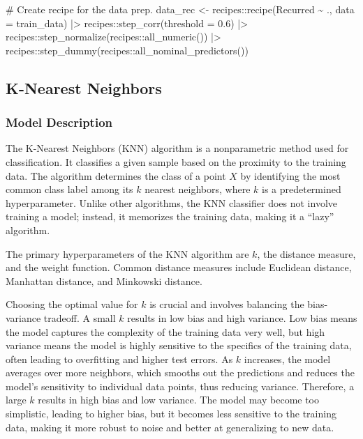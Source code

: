 \documentclass[
  letterpaper,
  DIV=11,
  numbers=noendperiod]{scrartcl}
\newenvironment{Shaded}{\begin{snugshade}}{\end{snugshade}}
\newcommand{\AttributeTok}[1]{\textcolor[rgb]{0.40,0.45,0.13}{#1}}
\newcommand{\CommentTok}[1]{\textcolor[rgb]{0.37,0.37,0.37}{#1}}
\newcommand{\FloatTok}[1]{\textcolor[rgb]{0.68,0.00,0.00}{#1}}
\newcommand{\FunctionTok}[1]{\textcolor[rgb]{0.28,0.35,0.67}{#1}}
\newcommand{\NormalTok}[1]{\textcolor[rgb]{0.00,0.23,0.31}{#1}}
\newcommand{\OtherTok}[1]{\textcolor[rgb]{0.00,0.23,0.31}{#1}}
\newcommand{\SpecialCharTok}[1]{\textcolor[rgb]{0.37,0.37,0.37}{#1}}
\begin{document}
\begin{Shaded}
\begin{Highlighting}[]
\CommentTok{\# Create recipe for the data prep.}
\NormalTok{data\_rec }\OtherTok{\textless{}{-}}\NormalTok{ recipes}\SpecialCharTok{::}\FunctionTok{recipe}\NormalTok{(Recurred }\SpecialCharTok{\textasciitilde{}}\NormalTok{ ., }\AttributeTok{data =}\NormalTok{ train\_data) }\SpecialCharTok{|\textgreater{}}
\NormalTok{  recipes}\SpecialCharTok{::}\FunctionTok{step\_corr}\NormalTok{(}\AttributeTok{threshold =} \FloatTok{0.6}\NormalTok{) }\SpecialCharTok{|\textgreater{}}
\NormalTok{  recipes}\SpecialCharTok{::}\FunctionTok{step\_normalize}\NormalTok{(recipes}\SpecialCharTok{::}\FunctionTok{all\_numeric}\NormalTok{()) }\SpecialCharTok{|\textgreater{}}
\NormalTok{  recipes}\SpecialCharTok{::}\FunctionTok{step\_dummy}\NormalTok{(recipes}\SpecialCharTok{::}\FunctionTok{all\_nominal\_predictors}\NormalTok{())}
\end{Highlighting}
\end{Shaded}

\subsection{K-Nearest Neighbors}\label{k-nearest-neighbors}

\subsubsection{Model Description}\label{model-description}

The K-Nearest Neighbors (KNN) algorithm is a nonparametric method used
for classification. It classifies a given sample based on the proximity
to the training data. The algorithm determines the class of a point
\(X\) by identifying the most common class label among its \(k\) nearest
neighbors, where \(k\) is a predetermined hyperparameter. Unlike other
algorithms, the KNN classifier does not involve training a model;
instead, it memorizes the training data, making it a ``lazy'' algorithm.

The primary hyperparameters of the KNN algorithm are \(k\), the distance
measure, and the weight function. Common distance measures include
Euclidean distance, Manhattan distance, and Minkowski distance.

Choosing the optimal value for \(k\) is crucial and involves balancing
the bias-variance tradeoff. A small \(k\) results in low bias and high
variance. Low bias means the model captures the complexity of the
training data very well, but high variance means the model is highly
sensitive to the specifics of the training data, often leading to
overfitting and higher test errors. As \(k\) increases, the model
averages over more neighbors, which smooths out the predictions and
reduces the model's sensitivity to individual data points, thus reducing
variance. Therefore, a large \(k\) results in high bias and low
variance. The model may become too simplistic, leading to higher bias,
but it becomes less sensitive to the training data, making it more
robust to noise and better at generalizing to new data.
\end{document}
